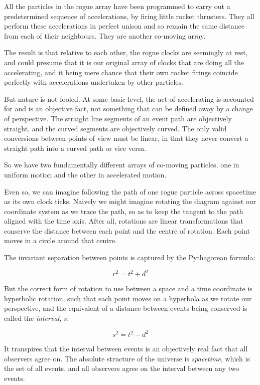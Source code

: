 All the particles in the rogue array have been programmed to carry out a predetermined sequence of accelerations, by firing little rocket thrusters. They all perform these accelerations in perfect unison and so remain the same distance from each of their neighbours. They are another co-moving array.

The result is that relative to each other, the rogue clocks are seemingly at rest, and could presume that it is our original array of clocks that are doing all the accelerating, and it being mere chance that their own rocket firings coincide perfectly with accelerations undertaken by other particles.

But nature is not fooled. At some basic level, the act of accelerating is accounted for and is an objective fact, not something that can be defined away by a change of perspective. The straight line segments of an event path are objectively straight, and the curved segments are objectively curved. The only valid conversions between points of view must be linear, in that they never convert a straight path into a curved path or vice versa.

So we have two fundamentally different arrays of co-moving particles, one in uniform motion and the other in accelerated motion.

Even so, we can imagine following the path of one rogue particle across spacetime as its own clock ticks. Naively we might imagine rotating the diagram against our coordinate system as we trace the path, so as to keep the tangent to the path aligned with the time axis. After all, rotations are linear transformations that conserve the distance between each point and the centre of rotation. Each point moves in a circle around that centre.

The invariant separation between points is captured by the Pythagorean formula:

$$r^2 = t^2 + d^2$$

But the correct form of rotation to use between a space and a time coordinate is hyperbolic rotation, such that each point moves on a hyperbola as we rotate our perspective, and the equivalent of a distance between events being conserved is called the \textit{interval}, $s$:

$$s^2 = t^2 - d^2$$

It transpires that the interval between events is an objectively real fact that all observers agree on. The absolute structure of the universe is \textit{spacetime}, which is the set of all events, and all observers agree on the interval between any two events.


